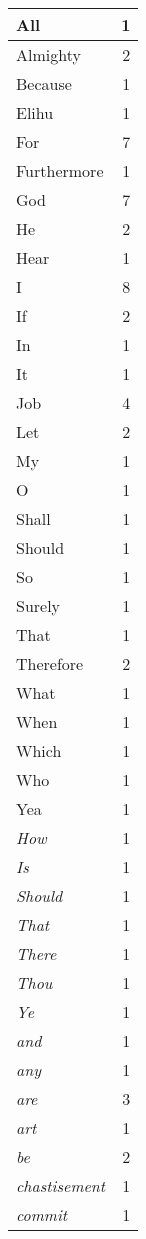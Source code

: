 \begin{center}
\begin{longtable}{l|r}
\hline \hline
\endlastfoot
All & 1 \\ \hline
Almighty & 2 \\ \hline
Because & 1 \\ \hline
Elihu & 1 \\ \hline
For & 7 \\ \hline
Furthermore & 1 \\ \hline
God & 7 \\ \hline
He & 2 \\ \hline
Hear & 1 \\ \hline
I & 8 \\ \hline
If & 2 \\ \hline
In & 1 \\ \hline
It & 1 \\ \hline
Job & 4 \\ \hline
Let & 2 \\ \hline
My & 1 \\ \hline
O & 1 \\ \hline
Shall & 1 \\ \hline
Should & 1 \\ \hline
So & 1 \\ \hline
Surely & 1 \\ \hline
That & 1 \\ \hline
Therefore & 2 \\ \hline
What & 1 \\ \hline
When & 1 \\ \hline
Which & 1 \\ \hline
Who & 1 \\ \hline
Yea & 1 \\ \hline
\emph{How} & 1 \\ \hline
\emph{Is} & 1 \\ \hline
\emph{Should} & 1 \\ \hline
\emph{That} & 1 \\ \hline
\emph{There} & 1 \\ \hline
\emph{Thou} & 1 \\ \hline
\emph{Ye} & 1 \\ \hline
\emph{and} & 1 \\ \hline
\emph{any} & 1 \\ \hline
\emph{are} & 3 \\ \hline
\emph{art} & 1 \\ \hline
\emph{be} & 2 \\ \hline
\emph{chastisement} & 1 \\ \hline
\emph{commit} & 1 \\ \hline

\end{longtable}
\end{center}
